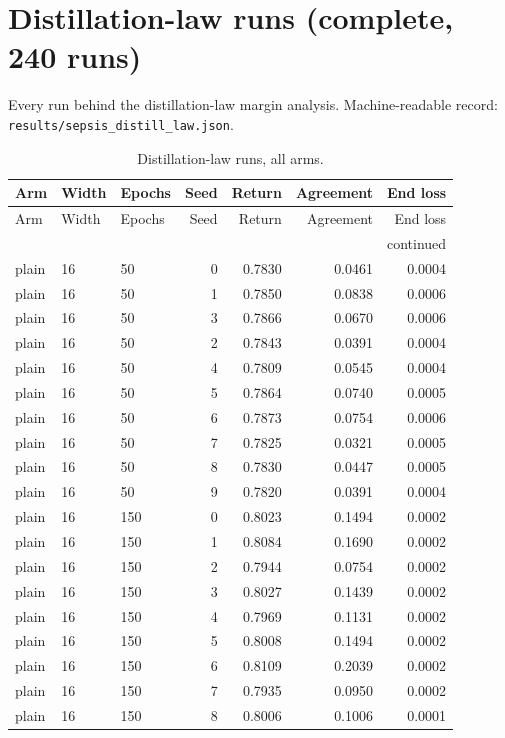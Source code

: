 \section{Distillation-law runs (complete, 240 runs)}
Every run behind the distillation-law margin analysis. Machine-readable record:\\ \texttt{results/sepsis\_distill\_law.json}.
\begin{footnotesize}\begin{longtable}{lllrrrr}
\caption{Distillation-law runs, all arms.}\\ \toprule
Arm & Width & Epochs & Seed & Return & Agreement & End loss \\ \midrule \endfirsthead
\toprule Arm & Width & Epochs & Seed & Return & Agreement & End loss \\ \midrule \endhead
\midrule \multicolumn{7}{r}{continued}\\ \endfoot \bottomrule \endlastfoot
plain & 16 & 50 & 0 & 0.7830 & 0.0461 & 0.0004 \\
plain & 16 & 50 & 1 & 0.7850 & 0.0838 & 0.0006 \\
plain & 16 & 50 & 3 & 0.7866 & 0.0670 & 0.0006 \\
plain & 16 & 50 & 2 & 0.7843 & 0.0391 & 0.0004 \\
plain & 16 & 50 & 4 & 0.7809 & 0.0545 & 0.0004 \\
plain & 16 & 50 & 5 & 0.7864 & 0.0740 & 0.0005 \\
plain & 16 & 50 & 6 & 0.7873 & 0.0754 & 0.0006 \\
plain & 16 & 50 & 7 & 0.7825 & 0.0321 & 0.0005 \\
plain & 16 & 50 & 8 & 0.7830 & 0.0447 & 0.0005 \\
plain & 16 & 50 & 9 & 0.7820 & 0.0391 & 0.0004 \\
plain & 16 & 150 & 0 & 0.8023 & 0.1494 & 0.0002 \\
plain & 16 & 150 & 1 & 0.8084 & 0.1690 & 0.0002 \\
plain & 16 & 150 & 2 & 0.7944 & 0.0754 & 0.0002 \\
plain & 16 & 150 & 3 & 0.8027 & 0.1439 & 0.0002 \\
plain & 16 & 150 & 4 & 0.7969 & 0.1131 & 0.0002 \\
plain & 16 & 150 & 5 & 0.8008 & 0.1494 & 0.0002 \\
plain & 16 & 150 & 6 & 0.8109 & 0.2039 & 0.0002 \\
plain & 16 & 150 & 7 & 0.7935 & 0.0950 & 0.0002 \\
plain & 16 & 150 & 8 & 0.8006 & 0.1006 & 0.0001 \\

\end{longtable}
\end{footnotesize}

